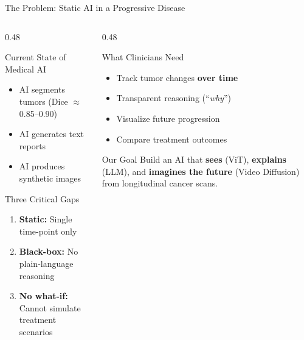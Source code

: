 \documentclass[aspectratio=169,xcolor=dvipsnames]{beamer}
\begin{document}
\begin{frame}{The Problem: Static AI in a Progressive Disease}
    \begin{columns}
        \begin{column}{0.48\textwidth}
            \begin{block}{Current State of Medical AI}
                \begin{itemize}
                    \item AI segments tumors (Dice $\approx$ 0.85--0.90)
                    \item AI generates text reports
                    \item AI produces synthetic images
                \end{itemize}
            \end{block}

            \vspace{0.3em}

            \begin{alertblock}{Three Critical Gaps}
                \begin{enumerate}
                    \item \textbf{Static:} Single time-point only
                    \item \textbf{Black-box:} No plain-language reasoning
                    \item \textbf{No what-if:} Cannot simulate treatment scenarios
                \end{enumerate}
            \end{alertblock}
        \end{column}

        \begin{column}{0.48\textwidth}
            \begin{block}{What Clinicians Need}
                \begin{itemize}
                    \item Track tumor changes \textbf{over time}
                    \item Transparent reasoning (``\textit{why}'')
                    \item Visualize future progression
                    \item Compare treatment outcomes
                \end{itemize}
            \end{block}

            \vspace{0.3em}

            \begin{exampleblock}{Our Goal}
                Build an AI that \textbf{sees} (ViT), \textbf{explains} (LLM), and \textbf{imagines the future} (Video Diffusion) from longitudinal cancer scans.
            \end{exampleblock}
        \end{column}
    \end{columns}
\end{frame}
\end{document}
